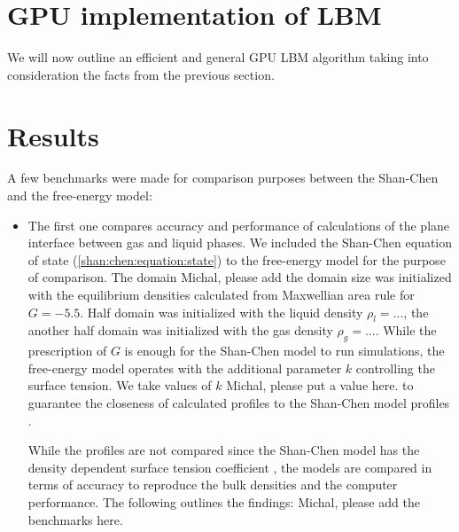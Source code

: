 \documentclass[mathpazo]{cicp}
\begin{document}
\section{GPU implementation of LBM}

We will now outline an efficient and general GPU LBM algorithm taking into consideration
the facts from the previous section.

\section{Results}
\label{sec:benchmark}
A few benchmarks were made for comparison purposes between the Shan-Chen and the free-energy model:
\begin{itemize}
\item The first one compares accuracy and performance of calculations of the
	plane interface between gas and liquid phases.  We included the Shan-Chen
	equation of state (\ref{shan:chen:equation:state}) to the free-energy model
	for the purpose of comparison. The domain {\color{red} Michal, please add
	the domain size} was initialized with the equilibrium densities calculated
	from Maxwellian area rule for $G=-5.5$. Half domain was initialized with
	the liquid density $\rho_l=...$, the another half domain was initialized
	with the gas density $\rho_g=...$. While the prescription of $G$ is enough
	for the Shan-Chen model to run simulations, the free-energy model operates
	with the additional parameter $k$ controlling the surface tension. We take
	values of $k$ {\color{red} Michal, please put a value here.} to guarantee
	the closeness of calculated profiles to the Shan-Chen model profiles
	\cite{sbragaglia-contact, kuzmin-thesis}.

While the profiles are not compared since the Shan-Chen model has the density
dependent surface tension coefficient \cite{shan-chen-free}, the models are
compared in terms of accuracy to reproduce the bulk densities and the computer
performance. The following outlines the findings: {\color{red} Michal, please
add the benchmarks here}.


\end{itemize}
\end{document}
